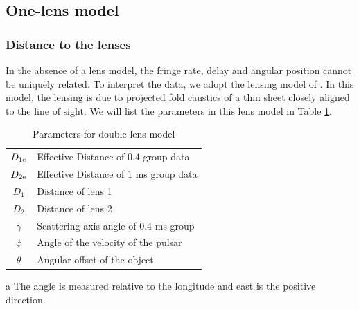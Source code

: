 \documentclass[useAMS,usenatbib]{mn2e}
\begin{document}
\subsection{One-lens model}
\subsubsection{Distance to the lenses}
In the absence of a lens model, the
fringe rate, delay and angular position cannot be uniquely related.  To interpret the data, we adopt the lensing model of
\citet{2014MNRAS.442.3338P}.  In this model, the lensing is due to projected fold caustics of a thin sheet closely aligned to the line of sight.  We will list the parameters in this lens model in Table \ref{tab:parameters}.

\begin{table}
\caption{Parameters for double-lens model}
\begin{threeparttable}
\begin{tabular}{cl}
\hline
$D_{1\rm e}$  & 
Effective Distance of $0.4$ group data\\
$D_{2\rm e}$ 
	&  Effective Distance of $1$ ms group data\\
$D_1$ 		&  Distance of lens 1 \\
$D_2$	& Distance of lens 2 \\
$\gamma$ &  Scattering axis angle of $0.4$ ms group\tnote{a} \\
$\phi$	& Angle of the velocity of the pulsar\tnote{a}\\
$\theta$ & Angular offset of the object \\
\hline
\end{tabular}

\begin{tablenotes}
\item[a]{The angle is measured relative to the longitude and east is the positive direction.}
\end{tablenotes}
\label{tab:parameters}
\end{threeparttable}
\end{table}


\end{document}
